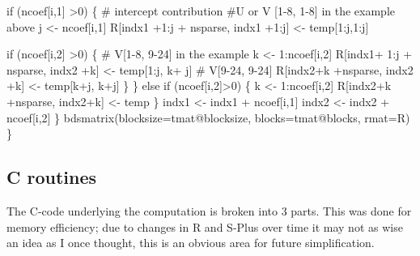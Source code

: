 \documentclass{article}
\begin{document}
\begin{nwchunk}
         if (ncoef[i,1] >0)  \{ # intercept contribution
             #U or V [1-8, 1-8] in the example above
             j <- ncoef[i,1]
             R[indx1 +1:j + nsparse, indx1 +1:j] <- temp[1:j,1:j]
             
             if (ncoef[i,2] >0) \{
                 # V[1-8, 9-24] in the example
                 k <- 1:ncoef[i,2]
                 R[indx1+ 1:j + nsparse, indx2 +k] <- temp[1:j, k+ j]
                 # V[9-24, 9-24]
                 R[indx2+k +nsparse, indx2 +k] <- temp[k+j, k+j]
                 \}
             \}
         else if (ncoef[i,2]>0) \{
             k <- 1:ncoef[i,2]
             R[indx2+k +nsparse, indx2+k] <- temp
             \}
         indx1 <- indx1 + ncoef[i,1]
         indx2 <- indx2 + ncoef[i,2]
         \}
     bdsmatrix(blocksize=tmat@blocksize, blocks=tmat@blocks, rmat=R)
     \}    
\end{nwchunk}

\subsection{C routines}
The C-code underlying the computation is broken into 3 parts.
This was done for memory efficiency; due to changes in R and
S-Plus over time it may not as wise an idea as I once thought,
this is an obvious area for future simplification.
\end{document}
